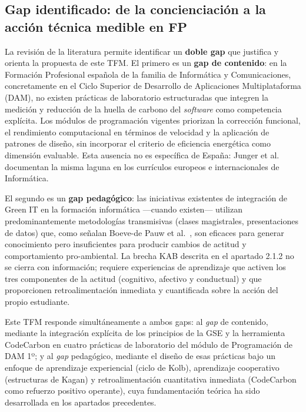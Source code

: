 \subsection{Gap identificado: de la concienciación a la acción técnica medible en FP}


La revisión de la literatura permite identificar un \textbf{doble gap} que justifica y orienta la propuesta de este TFM. El primero es un \textbf{gap de contenido}: en la Formación Profesional española de la familia de Informática y Comunicaciones, concretamente en el Ciclo Superior de Desarrollo de Aplicaciones Multiplataforma (DAM), no existen prácticas de laboratorio estructuradas que integren la medición y reducción de la huella de carbono del \textit{software} como competencia explícita. Los módulos de programación vigentes priorizan la corrección funcional, el rendimiento computacional en términos de velocidad y la aplicación de patrones de diseño, sin incorporar el criterio de eficiencia energética como dimensión evaluable. Esta ausencia no es específica de España: Junger et al.~\cite{junger2024potentials} documentan la misma laguna en los currículos europeos e internacionales de Informática.


El segundo es un \textbf{gap pedagógico}: las iniciativas existentes de integración de Green IT en la formación informática —cuando existen— utilizan predominantemente metodologías transmisivas (clases magistrales, presentaciones de datos) que, como señalan Boeve-de Pauw et al.~\cite{boevedepauw2015effectiveness}, son eficaces para generar conocimiento pero insuficientes para producir cambios de actitud y comportamiento pro-ambiental. La brecha KAB descrita en el apartado 2.1.2 no se cierra con información; requiere experiencias de aprendizaje que activen los tres componentes de la actitud (cognitivo, afectivo y conductual) y que proporcionen retroalimentación inmediata y cuantificada sobre la acción del propio estudiante.


Este TFM responde simultáneamente a ambos gaps: al \textit{gap} de contenido, mediante la integración explícita de los principios de la GSE y la herramienta CodeCarbon en cuatro prácticas de laboratorio del módulo de Programación de DAM 1º; y al \textit{gap} pedagógico, mediante el diseño de esas prácticas bajo un enfoque de aprendizaje experiencial (ciclo de Kolb), aprendizaje cooperativo (estructuras de Kagan) y retroalimentación cuantitativa inmediata (CodeCarbon como refuerzo positivo operante), cuya fundamentación teórica ha sido desarrollada en los apartados precedentes.
